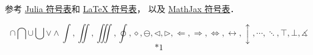 
参考 \href{https://docs.julialang.org/en/v1/manual/unicode-input/}{Julia 符号表}和 \href{https://oeis.org/wiki/List_of_LaTeX_mathematical_symbols}{LaTeX 符号表}， 以及 \href{http://www.onemathematicalcat.org/MathJaxDocumentation/TeXSyntax.htm#U}{MathJax 符号表}．

\begin{equation}\label{test_eq1}
\cap\bigcap\cup\bigcup\vee\wedge\int, \iint, \iiint, \oint, \diamond, \ominus, \triangleleft, \triangleright, \Longleftarrow, \Longrightarrow, \iff, \leftrightarrow, \updownarrow, \cdots, \ddots, \top, \bot, \measuredangle
\end{equation}
\begin{equation}\label{test_eq2}
\ast 1
\end{equation}

